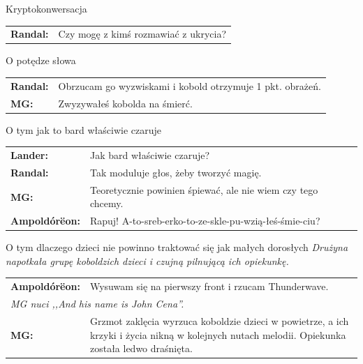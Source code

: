 \documentclass[10pt,twoside,twocolumn]{book}
\begin{document}
\begin{rpg-quotebox}{Kryptokonwersacja}
   \begin{tabularx}{\columnwidth}{lX}
      \textbf{Randal:} &  Czy mogę z kimś rozmawiać z ukrycia?\\
   \end{tabularx}
\end{rpg-quotebox}

\begin{rpg-quotebox}{O potędze słowa}
   \begin{tabularx}{\columnwidth}{lX}
      \textbf{Randal:} &  Obrzucam go wyzwiskami i kobold otrzymuje 1 pkt. obrażeń.\\
      \textbf{MG:} &  Zwyzywałeś kobolda na śmierć.\\
   \end{tabularx}
\end{rpg-quotebox}

\begin{rpg-quotebox}{O tym jak to bard właściwie czaruje}
   \begin{tabularx}{\columnwidth}{lX}
      \textbf{Lander:} &  Jak bard właściwie czaruje?\\
      \textbf{Randal:} &  Tak moduluje głos, żeby tworzyć magię.\\
      \textbf{MG:} &  Teoretycznie powinien śpiewać, ale nie wiem czy tego chcemy.\\
      \textbf{Ampoldórëon:} &  Rapuj! A-to-sreb-erko-to-ze-skle-pu-wzią-łeś-śmie-ciu?\\
   \end{tabularx}
\end{rpg-quotebox}

\begin{rpg-quotebox}{O tym dlaczego dzieci nie powinno traktować się jak małych dorosłych}
   \textit{Drużyna napotkała grupę koboldzich dzieci i czujną pilnującą ich opiekunkę.}\\
  
   \begin{tabularx}{\columnwidth}{lX}
      \textbf{Ampoldórëon:} &  Wysuwam się na pierwszy front i rzucam Thunderwave.\\
      \multicolumn{2}{l}{\textit{MG nuci ,,And his name is John Cena''.}}\\
      \textbf{MG:} &  Grzmot zaklęcia wyrzuca koboldzie dzieci w powietrze, a ich krzyki i życia nikną w kolejnych nutach melodii. Opiekunka została ledwo draśnięta.\\
   \end{tabularx}
\end{rpg-quotebox}
\end{document}
